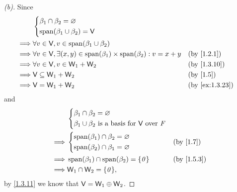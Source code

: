 \begin{proof}[(b)]
  Since
  \begin{align*}
             & \begin{dcases}
                 \beta_1 \cap \beta_2 = \varnothing \\
                 \spn{\beta_1 \cup \beta_2} = \V
               \end{dcases}                                                                                    \\
    \implies & \forall v \in \V, v \in \spn{\beta_1 \cup \beta_2}                                                                    \\
    \implies & \forall v \in \V, \exists (x, y) \in \spn{\beta_1} \times \spn{\beta_2} : v = x + y &  & \text{(by \cref{1.2.1})}     \\
    \implies & \forall v \in \V, v \in \W_1 + \W_2                                                 &  & \text{(by \cref{1.3.10})}    \\
    \implies & \V \subseteq \W_1 + \W_2                                                            &  & \text{(by \cref{1.5})}       \\
    \implies & \V = \W_1 + \W_2                                                                    &  & \text{(by \cref{ex:1.3.23})}
  \end{align*}
  and
  \begin{align*}
             & \begin{dcases}
                 \beta_1 \cap \beta_2 = \varnothing \\
                 \beta_1 \cup \beta_2 \text{ is a basis for } \V \text{ over } \F
               \end{dcases}                                \\
    \implies & \begin{dcases}
                 \spn{\beta_1} \cap \beta_2 = \varnothing \\
                 \spn{\beta_2} \cap \beta_1 = \varnothing
               \end{dcases}                      &  & \text{(by \cref{1.7})}                                  \\
    \implies & \spn{\beta_1} \cap \spn{\beta_2} = \set{\zv}                     &  & \text{(by \cref{1.5.3})} \\
    \implies & \W_1 \cap \W_2 = \set{\zv},
  \end{align*}
  by \cref{1.3.11} we know that \(\mathsf{V} = \mathsf{W}_1 \oplus \mathsf{W}_2\).
\end{proof}

